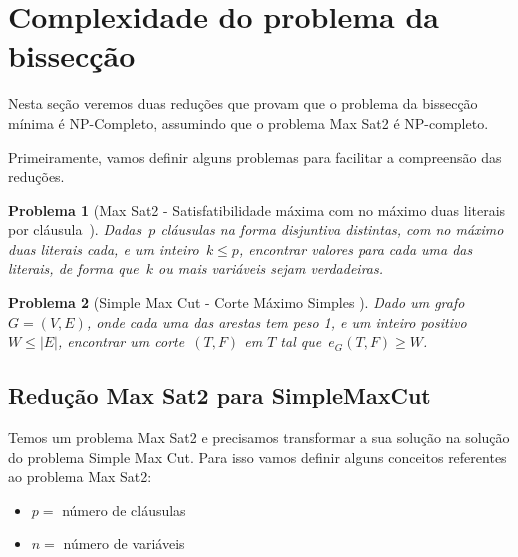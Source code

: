 \documentclass[a4paper,12pt]{article}
\newtheorem{prob}{Problema}
\begin{document}
\newpage
\section {Complexidade do problema da bissecção}
	Nesta seção veremos duas reduções que provam que o problema 
	da bissecção mínima é NP-Completo, assumindo
	que o problema Max Sat2 é NP-completo.

	Primeiramente, vamos definir alguns problemas para facilitar
	a compreensão das reduções.

	\medskip

	\begin{prob}[Max Sat2 - Satisfatibilidade máxima com no máximo 
	duas literais por cláusula{~\cite{GareyJS76}}]
		Dadas~$p$ cláusulas na forma disjuntiva distintas, com no máximo
		duas literais cada, e um inteiro~$k\le p$,
		encontrar valores para cada uma das literais, de forma
		que~$k$ ou mais variáveis sejam verdadeiras.

	\end{prob}

	\medskip

	\begin{prob}[Simple Max Cut - Corte Máximo Simples 
]
		Dado um grafo~${G=(V,E)}$, onde cada uma das arestas tem 
		peso 1, e um inteiro positivo~${W\le|E|}$, encontrar um
		corte~$(T,F)$ em $T$ tal 
		que~${e_G(T,F)\ge W}$.
		
	\end{prob}

	

		

	\bigskip
	\bigskip
	\bigskip

	\subsection{Redução Max Sat2 para SimpleMaxCut}

		Temos um problema Max Sat2 e precisamos transformar
		a sua solução na solução do problema Simple Max Cut.
		Para isso vamos definir alguns conceitos referentes
		ao problema Max Sat2:
		\begin{itemize}
			\item $p = $ número de cláusulas
			\item $n = $ número de variáveis
		\end{itemize}
\end{document}
